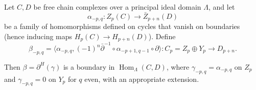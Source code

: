 Let $C, D$ be free chain complexes over a principal ideal domain $\Lambda$, and let
$$\alpha_{-p,q} : Z_p(C) \rightarrow \bar{Z}_{p+n}(D)$$
be a family of homomorphisms defined on cycles that vanish on boundaries (hence inducing maps $H_p(C) \rightarrow H_{p+n}(D)$). Define
$$\beta_{-p,q} = \langle \alpha_{-p,q}, (-1)^n \bar{\partial}^{-1} \circ \alpha_{-p+1,q-1} \circ \partial \rangle : C_p = Z_p \oplus Y_p \rightarrow D_{p+n}.$$

Then $\beta = \partial^H(\gamma)$ is a boundary in $\operatorname{Hom}_{\Lambda}(C, D)$, where $\gamma_{-p,q} = \alpha_{-p,q}$ on $Z_p$ and $\gamma_{-p,q} = 0$ on $Y_p$ for $q$ even, with an appropriate extension.
